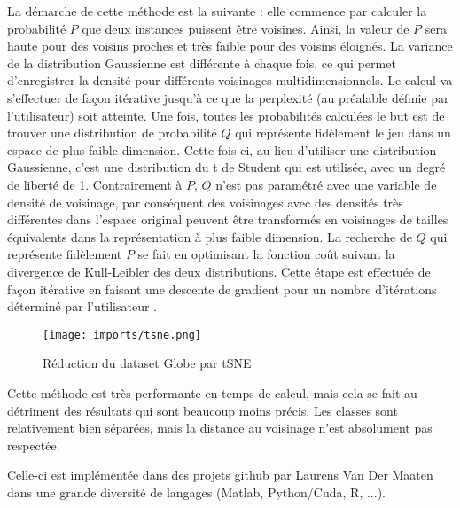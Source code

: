 La démarche de cette méthode est la suivante : elle commence par calculer la  probabilité $P$ que deux instances puissent être voisines. Ainsi, la valeur de $P$ sera haute pour des voisins proches et très faible pour des voisins éloignés.\newline
La variance de la distribution Gaussienne est différente à chaque fois, ce qui permet d'enregistrer la densité pour différents voisinages multidimensionnels.
Le calcul va s’effectuer de façon itérative jusqu’à ce que la perplexité (au préalable définie par l’utilisateur) soit atteinte.
\newline Une fois, toutes les probabilités calculées le but est de trouver une distribution de probabilité $Q$ qui représente fidèlement le jeu dans un espace de plus faible dimension. Cette fois-ci, au lieu d’utiliser une distribution Gaussienne, c’est une distribution du t de Student qui est utilisée, avec un degré de liberté de 1. 
\newline Contrairement à $P$, $Q$ n’est pas paramétré avec une variable de densité de voisinage, par conséquent des voisinages avec des densités très différentes dans l’espace original peuvent être transformés en  voisinages de tailles équivalents dans la représentation à plus faible dimension.
La recherche de $Q$ qui représente fidèlement $P$ se fait en optimisant la fonction coût suivant la divergence de Kull-Leibler des deux distributions. Cette étape est effectuée de façon itérative en faisant une descente de gradient pour un nombre d’itérations déterminé par l’utilisateur \cite{van2008TSNE}.

\begin{center}
    \begin{figure}[ht!]
        \centering
        
        \texttt{[image: imports/tsne.png]}
        
        \caption{Réduction du dataset Globe par tSNE}
    \end{figure}
\end{center}

Cette méthode est très performante en temps de calcul, mais cela se fait au détriment des résultats qui sont beaucoup moins précis. 
Les classes sont relativement bien séparées, mais la distance au voisinage n'est absolument pas respectée.

Celle-ci est implémentée dans des projets \href{https://lvdmaaten.github.io/tsne/}{github} par Laurens Van Der Maaten dans une grande diversité de langages (Matlab, Python/Cuda, R, ...). 

